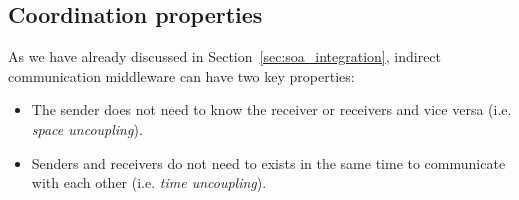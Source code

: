 


\subsection{Coordination properties}
\label{sec:coordination_properties}

As we have already discussed in Section~\ref{sec:soa_integration}, indirect communication middleware can have two key properties:
\begin{itemize}
  \item The sender does not need to know the receiver or receivers and vice versa (i.e. \emph{space uncoupling}).
  \item Senders and receivers do not need to exists in the same time to communicate with each other (i.e. \emph{time uncoupling}).
\end{itemize}


